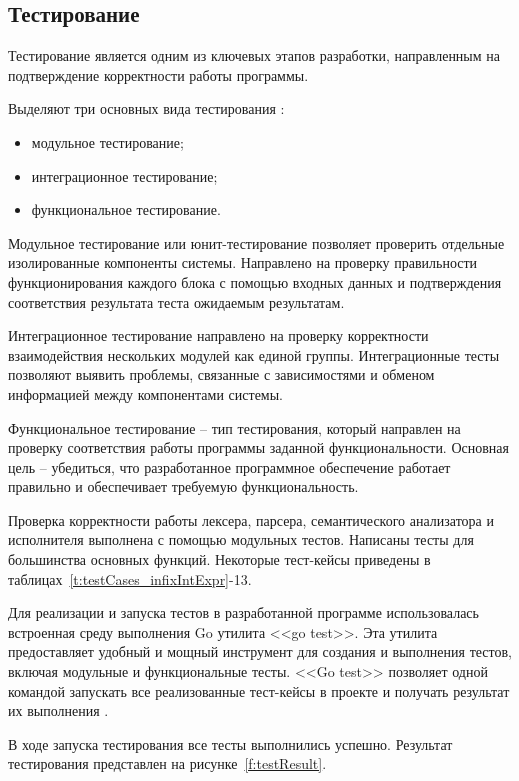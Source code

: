 \subsection{Тестирование}

Тестирование является одним из ключевых этапов разработки, направленным на подтверждение корректности работы программы.

Выделяют три основных вида тестирования :
\begin{itemize}
    \item модульное тестирование;
    \item интеграционное тестирование;
    \item функциональное тестирование.
\end{itemize}

Модульное тестирование или юнит-тестирование позволяет проверить отдельные изолированные компоненты системы.
Направлено на проверку правильности функционирования каждого блока с помощью входных данных и подтверждения соответствия результата теста ожидаемым результатам.

Интеграционное тестирование направлено на проверку корректности взаимодействия нескольких модулей как единой группы.
Интеграционные тесты позволяют выявить проблемы, связанные с зависимостями и обменом информацией между компонентами системы.

Функциональное тестирование -- тип тестирования, который направлен на проверку соответствия работы программы заданной функциональности.
Основная цель -- убедиться, что разработанное программное обеспечение работает правильно и обеспечивает требуемую функциональность.

Проверка корректности работы лексера, парсера, семантического анализатора и исполнителя выполнена с помощью модульных тестов.
Написаны тесты для большинства основных функций.
Некоторые тест-кейсы приведены в таблицах~\ref{t:testCases_infixIntExpr}-13.

Для реализации и запуска тестов в разработанной программе использовалась встроенная среду выполнения Go утилита <<go test>>.
Эта утилита предоставляет удобный и мощный инструмент для создания и выполнения тестов, включая модульные и функциональные тесты.
<<Go test>> позволяет одной командой запускать все реализованные тест-кейсы в проекте и получать результат их выполнения .


В ходе запуска тестирования все тесты выполнились успешно. Результат тестирования представлен на рисунке~\ref{f:testResult}.

